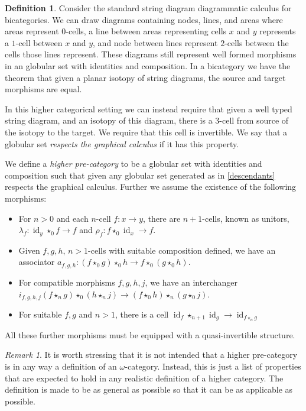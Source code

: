 \documentclass{article}
\theoremstyle{definition}
\newtheorem{definition}{Definition}
\theoremstyle{remark}
\newtheorem{remark}{Remark}
\DeclareMathOperator{\id}{id}
\newcommand{\comp}{\star}
\begin{document}
\begin{definition}\label{def:higher-cat}
  Consider the standard string diagram diagrammatic calculus for bicategories. We can draw diagrams containing nodes, lines, and areas where areas represent \(0\)-cells, a line between areas representing cells \(x\) and \(y\) represents a \(1\)-cell between \(x\) and \(y\), and node between lines represent \(2\)-cells between the cells those lines represent. These diagrams still represent well formed morphisms in an globular set with identities and composition. In a bicategory we have the theorem that given a planar isotopy of string diagrams, the source and target morphisms are equal.

  In this higher categorical setting we can instead require that given a well typed string diagram, and an isotopy of this diagram, there is a \(3\)-cell from source of the isotopy to the target. We require that this cell is invertible. We say that a globular set \emph{respects the graphical calculus} if it has this property.

  We define a \emph{higher pre-category} to be a globular set with identities and composition such that given any globular set generated as in \cref{descendants} respects the graphical calculus. Further we assume the existence of the following morphisms:
  \begin{itemize}
  \item For \(n>0\) and each \(n\)-cell \(f: x \to y\), there are \(n+1\)-cells, known as unitors, \(\lambda_f: \id_y \comp_0 f \to f\) and \(\rho_f: f \comp_0 \id_x \to f\).
  \item Given \(f,g,h\), \(n>1\)-cells with suitable composition defined, we have an associator \(a_{f,g,h} : (f \comp_0 g) \comp_0 h \to f \comp_0 (g \comp_0 h)\).
  \item For compatible morphisms \(f,g,h,j\), we have an interchanger \(i_{f,g,h,j}(f \comp_n g) \comp_0 (h \comp_n j) \to (f \comp_0 h) \comp_n (g \comp_0 j)\).
  \item For suitable \(f,g\) and \(n > 1\), there is a cell \(\id_f \comp_{n+1} \id_g \to \id_{f \comp_n g}\)
  \end{itemize}
  All these further morphisms must be equipped with a quasi-invertible structure.
\end{definition}

\begin{remark}
  It is worth stressing that it is not intended that a higher pre-category is in any way a definition of an \(\omega\)-category. Instead, this is just a list of properties that are expected to hold in any realistic definition of a higher category. The definition is made to be as general as possible so that it can be as applicable as possible.
\end{remark}
\end{document}

